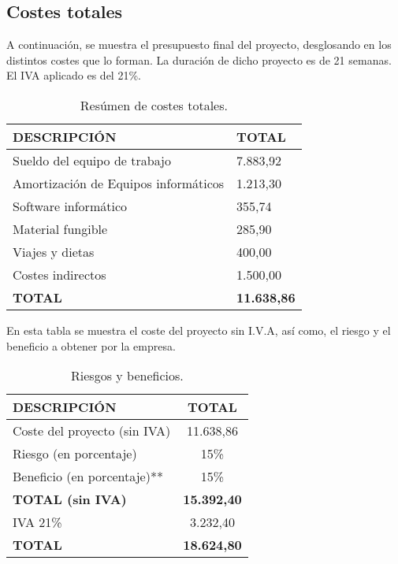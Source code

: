 \newpage
\subsection{Costes totales}
\par A continuación, se muestra el presupuesto final del proyecto, desglosando en los distintos costes que lo forman. La duración de dicho proyecto es de 21 semanas. El IVA aplicado es del 21\%.

\begin{table}[H]
\begin{center}
\begin{tabular}{l l}
\textbf{DESCRIPCIÓN} & \textbf{TOTAL}\\ \hline \hline
Sueldo del equipo de trabajo & 7.883,92\\
Amortización de Equipos informáticos & 1.213,30\\
Software informático & 355,74\\
Material fungible & 285,90\\
Viajes y dietas & 400,00\\
Costes indirectos & 1.500,00\\ \hline \hline
\textbf{TOTAL} & \textbf{11.638,86}\\ \hline
\end{tabular}
\caption{Resúmen de costes totales.}
\label{tab:resumenTotal}
\end{center}
\end{table}

En esta tabla se muestra el coste del proyecto sin I.V.A, así como, el riesgo y el beneficio a obtener por la empresa.
\begin{table}[H]
\begin{center}
\begin{tabular}{l c}
\textbf{DESCRIPCIÓN} & \textbf{TOTAL}\\ \hline \hline
Coste del proyecto (sin IVA) &  11.638,86\\
Riesgo (en porcentaje) & 15\% \\
Beneficio (en porcentaje)** & 15\% \\ \hline \hline
\textbf{TOTAL (sin IVA)} & \textbf{15.392,40}\\ \hline \hline
IVA 21\% & 3.232,40 \\\hline \hline
\textbf{TOTAL} &  \textbf{18.624,80}\\ \hline
\end{tabular}
\caption{Riesgos y beneficios.}
\label{tab:total}
\end{center}
\end{table}
